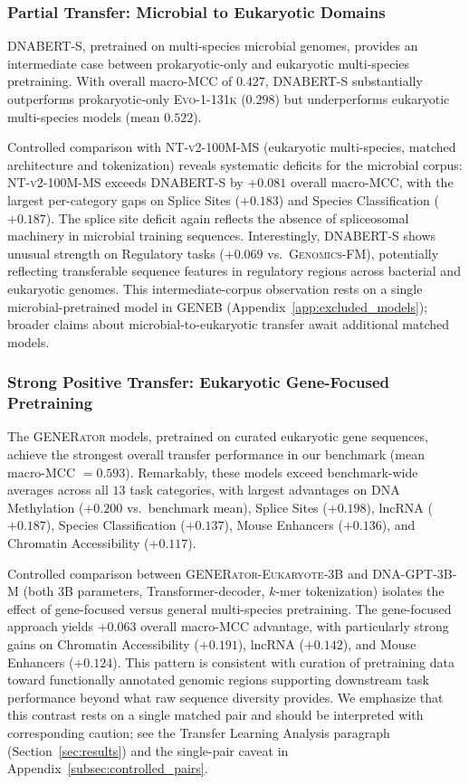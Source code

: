 \documentclass{article}
\theoremstyle{plain}
\theoremstyle{definition}
\theoremstyle{remark}
\begin{document}
\subsubsection{Partial Transfer: Microbial to Eukaryotic Domains}

\textsc{DNABERT-S}, pretrained on multi-species microbial genomes,
provides an intermediate case between prokaryotic-only and
eukaryotic multi-species pretraining. With overall macro-MCC of
$0.427$, \textsc{DNABERT-S} substantially outperforms
prokaryotic-only \textsc{Evo-1-131k} ($0.298$) but underperforms
eukaryotic multi-species models (mean $0.522$).

Controlled comparison with \textsc{NT-v2-100M-MS} (eukaryotic
multi-species, matched architecture and tokenization) reveals
systematic deficits for the microbial corpus:
\textsc{NT-v2-100M-MS} exceeds \textsc{DNABERT-S} by $+0.081$
overall macro-MCC, with the largest per-category gaps on Splice
Sites ($+0.183$) and Species Classification ($+0.187$). The splice
site deficit again reflects the absence of spliceosomal machinery
in microbial training sequences. Interestingly, \textsc{DNABERT-S}
shows unusual strength on Regulatory tasks ($+0.069$ vs.\
\textsc{Genomics-FM}), potentially reflecting transferable sequence
features in regulatory regions across bacterial and eukaryotic
genomes. This intermediate-corpus observation rests on a single
microbial-pretrained model in GENEB
(Appendix~\ref{app:excluded_models}); broader claims about
microbial-to-eukaryotic transfer await additional matched models.

\subsubsection{Strong Positive Transfer: Eukaryotic Gene-Focused Pretraining}
The \textsc{GENERator} models, pretrained on curated eukaryotic
gene sequences, achieve the strongest overall transfer performance
in our benchmark (mean macro-MCC $= 0.593$). Remarkably, these
models exceed benchmark-wide averages across all $13$ task
categories, with largest advantages on DNA Methylation ($+0.200$
vs.\ benchmark mean), Splice Sites ($+0.198$), lncRNA ($+0.187$),
Species Classification ($+0.137$), Mouse Enhancers ($+0.136$),
and Chromatin Accessibility ($+0.117$).

Controlled comparison between \textsc{GENERator-Eukaryote-3B} and
\textsc{DNA-GPT-3B-M} (both 3B parameters, Transformer-decoder,
$k$-mer tokenization) isolates the effect of gene-focused versus
general multi-species pretraining. The gene-focused approach
yields $+0.063$ overall macro-MCC advantage, with particularly
strong gains on Chromatin Accessibility ($+0.191$), lncRNA
($+0.142$), and Mouse Enhancers ($+0.124$). This pattern is
consistent with curation of pretraining data toward functionally
annotated genomic regions supporting downstream task performance
beyond what raw sequence diversity provides. We emphasize that
this contrast rests on a single matched pair and should be
interpreted with corresponding caution; see the Transfer Learning
Analysis paragraph (Section~\ref{sec:results}) and the
single-pair caveat in Appendix~\ref{subsec:controlled_pairs}.
\end{document}
